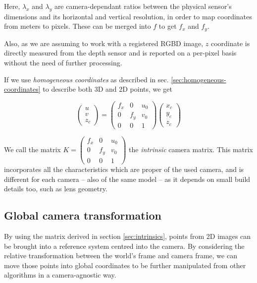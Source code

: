 Here, $\lambda _x$ and $\lambda _y$ are camera-dependant ratios between the
physical sensor's dimensions and its horizontal and vertical resolution, in
order to map coordinates from meters to pixels. These can be merged into $f$ to
get $f_x$ and $f_y$.

Also, as we are assuming to work with a registered RGBD image, $z$ coordinate is
directly measured from the depth sensor and is reported on a per-pixel basis
without the need of further processing.

If we use \emph{homogeneous coordinates} as described in sec.
\ref{sec:homogeneous-coordinates}
to describe both 3D and 2D points, we get

\begin{equation} \label{eqn:intrinsics}
\left(\begin{array}{c}u\\v\\z_c\end{array}\right)
  =
  \left(\begin{array}{cccc}
      f_x & 0 & u_0 \\
      0 & f_y & v_0 \\
      0 & 0   & 1 
  \end{array}\right)
\left(\begin{array}{c}x_c\\y_c\\z_c\end{array}\right)
\end{equation}

We call the matrix 
$K=
  \left(\begin{array}{cccc}
      f_x & 0 & u_0 \\
      0 & f_y & v_0 \\
      0 & 0   & 1 
\end{array}\right)$
the \emph{intrinsic} camera matrix. This matrix incorporates all the
characteristics which are proper of the used camera, and is different for each
camera -- also of the same model -- as it depends on small build details too,
such as lens geometry.

\subsection{Global camera transformation}
By using the matrix derived in section \ref{sec:intrinsics}, points from 2D
images can be brought into a reference system centred into the camera.
By considering the relative transformation between the world's frame and camera
frame, we can move those points into global coordinates to be further
manipulated from other algorithms in a camera-agnostic way.

